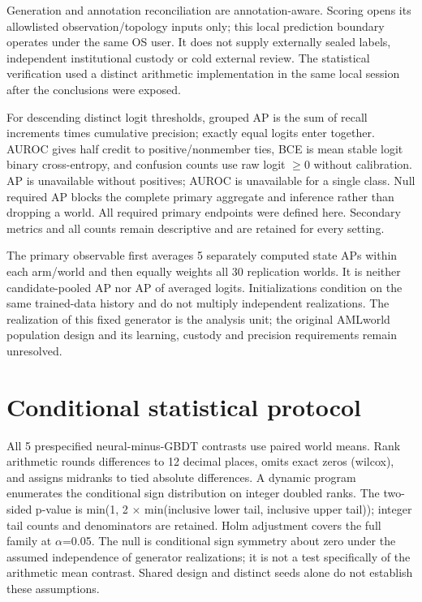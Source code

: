 \documentclass{article}
\begin{document}
Generation and annotation reconciliation are annotation-aware. Scoring opens its allowlisted observation/topology inputs only; this local prediction boundary operates under the same OS user. It does not supply externally sealed labels, independent institutional custody or cold external review. The statistical verification used a distinct arithmetic implementation in the same local session after the conclusions were exposed.

For descending distinct logit thresholds, grouped AP is the sum of recall increments times cumulative precision; exactly equal logits enter together. AUROC gives half credit to positive/nonmember ties, BCE is mean stable logit binary cross-entropy, and confusion counts use raw logit \(\geq\)0 without calibration. AP is unavailable without positives; AUROC is unavailable for a single class. Null required AP blocks the complete primary aggregate and inference rather than dropping a world. All required primary endpoints were defined here. Secondary metrics and all counts remain descriptive and are retained for every setting.

The primary observable first averages 5 separately computed state APs within each arm/world and then equally weights all 30 replication worlds. It is neither candidate-pooled AP nor AP of averaged logits. Initializations condition on the same trained-data history and do not multiply independent realizations. The realization of this fixed generator is the analysis unit; the original AMLworld population design and its learning, custody and precision requirements remain unresolved.

\section{Conditional statistical protocol}

All 5 prespecified neural-minus-GBDT contrasts use paired world means. Rank arithmetic rounds differences to 12 decimal places, omits exact zeros (wilcox), and assigns midranks to tied absolute differences. A dynamic program enumerates the conditional sign distribution on integer doubled ranks. The two-sided p-value is min(1, 2 \(\times\) min(inclusive lower tail, inclusive upper tail)); integer tail counts and denominators are retained. Holm adjustment covers the full family at \(\alpha\)=0.05. The null is conditional sign symmetry about zero under the assumed independence of generator realizations; it is not a test specifically of the arithmetic mean contrast. Shared design and distinct seeds alone do not establish these assumptions.
\end{document}
